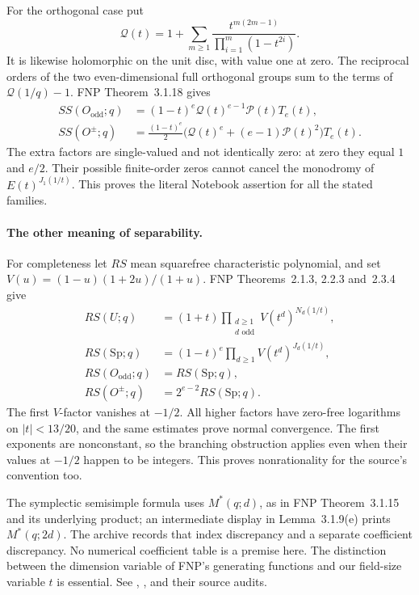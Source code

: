 For the orthogonal case put
\[
 \mathcal Q(t)=1+\sum_{m\ge1}
       \frac{t^{m(2m-1)}}{\prod_{i=1}^m(1-t^{2i})}.
\]
It is likewise holomorphic on the unit disc, with value one at zero.
The reciprocal orders of the two even-dimensional full orthogonal
groups sum to the terms of \(\mathcal Q(1/q)-1\).
FNP Theorem~3.1.18 gives
\[
\begin{aligned}
 SS(O_{\mathrm{odd}};q)&=
   (1-t)^e\mathcal Q(t)^{e-1}\mathcal P(t)T_e(t),\\
 SS(O^\pm;q)&=
   \frac{(1-t)^e}{2}
   \bigl(\mathcal Q(t)^e+(e-1)\mathcal P(t)^2\bigr)T_e(t).
\end{aligned}
\]
The extra factors are single-valued and not identically zero:
at zero they equal \(1\) and \(e/2\).
Their possible finite-order zeros cannot cancel the monodromy of
\(E(t)^{J_1(1/t)}\). This proves the literal Notebook assertion for
all the stated families.

\paragraph{The other meaning of separability.}
For completeness let \(RS\) mean squarefree characteristic polynomial,
and set \(V(u)=(1-u)(1+2u)/(1+u)\).
FNP Theorems~2.1.3, 2.2.3 and~2.3.4 give
\[
\begin{aligned}
 RS(U;q)&=(1+t)
       \prod_{\substack{d\ge1\\d\text{ odd}}}V(t^d)^{N_d(1/t)},\\
 RS(\mathrm{Sp};q)&=(1-t)^e
       \prod_{d\ge1}V(t^d)^{J_d(1/t)},\\
 RS(O_{\mathrm{odd}};q)&=RS(\mathrm{Sp};q),\\
 RS(O^\pm;q)&=2^{e-2}RS(\mathrm{Sp};q).
\end{aligned}
\]
The first \(V\)-factor vanishes at \(-1/2\).
All higher factors have zero-free logarithms on \(|t|<13/20\),
and the same estimates prove normal convergence.
The first exponents are nonconstant, so the branching obstruction
applies even when their values at \(-1/2\) happen to be integers.
This proves nonrationality for the source's convention too.

The symplectic semisimple formula uses \(M^*(q;d)\), as in FNP
Theorem~3.1.15 and its underlying product; an intermediate display
in Lemma~3.1.9(e) prints \(M^*(q;2d)\).
The archive records that index discrepancy and a separate coefficient
discrepancy. No numerical coefficient table is a premise here.
The distinction between the dimension variable of FNP's generating
functions and our field-size variable \(t\) is essential.
See ,
, and their source audits.
